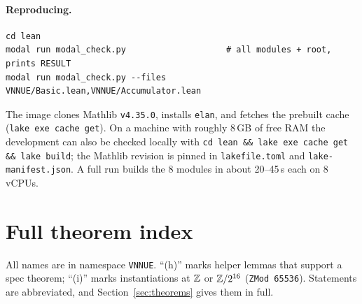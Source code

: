 \paragraph{Reproducing.}
\begin{verbatim}
cd lean
modal run modal_check.py                    # all modules + root, prints RESULT
modal run modal_check.py --files VNNUE/Basic.lean,VNNUE/Accumulator.lean
\end{verbatim}
The image clones Mathlib \texttt{v4.35.0}, installs \texttt{elan}, and fetches the prebuilt cache (\texttt{lake exe cache get}).
On a machine with roughly 8\,GB of free RAM the development can also be checked locally with \texttt{cd lean \&\& lake exe cache get \&\& lake build}; the Mathlib revision is pinned in \texttt{lakefile.toml} and \texttt{lake-manifest.json}.
A full run builds the 8 modules in about 20--45\,s each on 8 vCPUs.

\section{Full theorem index}\label{app:index}

All names are in namespace \texttt{VNNUE}.
``(h)'' marks helper lemmas that support a spec theorem; ``(i)'' marks instantiations at $\mathbb{Z}$ or $\mathbb{Z}/2^{16}$ (\texttt{ZMod 65536}).
Statements are abbreviated, and Section~\ref{sec:theorems} gives them in full.

